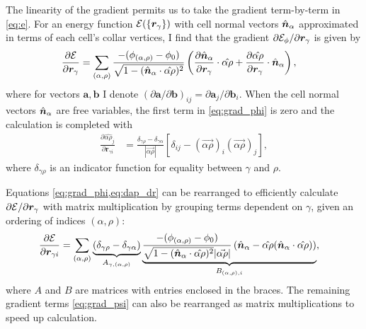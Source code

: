 The linearity of the gradient permits us to take the gradient term-by-term in \cref{eq:e}. For an energy function $\mathcal{E}(\{ \bm{r}_\gamma\})$ with cell normal vectors $\hat{\bm{n}}_\alpha$ approximated in terms of each cell's collar vertices, I find that the gradient $\partial \mathcal{E}_\phi / \partial \bm{r}_\gamma$ is given by 
\begin{align}
	\frac{\partial\mathcal{E}}{\partial\bm{r}_\gamma} &= \sum_{(\alpha,\rho)} \frac{-(\phi_{(\alpha,\rho)} - \phi_0)}{\sqrt{1-(\hat{\bm{n}}_\alpha \cdot \hat{\alpha\rho})^2}} \left(\frac{\partial \hat{\bm{n}}_\alpha}{\partial \bm{r}_\gamma} \cdot \hat{\alpha\rho} + \frac{\partial\hat{\alpha\rho}}{\partial\bm{r}_\gamma} \cdot \hat{\bm{n}}_\alpha \right), \label{eq:grad_phi}
\end{align}
\noindent where for vectors $\bm{a}, \bm{b}$ I denote $(\partial\bm{a}/\partial\bm{b})_{ij} = \partial\bm{a}_j /\partial\bm{b}_i$.
When the cell normal vectors $\hat{\bm{n}}_\alpha$ are free variables, the first term in \cref{eq:grad_phi} is zero and the calculation is completed with
\begin{align}
	\frac{\partial \hat{\alpha\rho}_j}{\partial\bm{r}_{\gamma i}} &= \frac{\delta_{\gamma\rho}-\delta_{\gamma\alpha}}{|\vec{\alpha\rho}|} \left[\delta_{ij} - (\vec{\alpha\rho})_i(\vec{\alpha\rho})_j \right], \label{eq:dap_dr}
\end{align}
where $\delta_{\gamma\rho}$ is an indicator function for equality between $\gamma$ and $\rho$. 

Equations \cref{eq:grad_phi,eq:dap_dr} can be rearranged to efficiently calculate $\partial\mathcal{E}/\partial\bm{r}_\gamma$ with matrix multiplication by grouping terms dependent on $\gamma$, given an ordering of indices $(\alpha,\rho)$:
\begin{align}
	\frac{\partial\mathcal{E}}{\partial\bm{r}_{\gamma i}} &= \sum_{(\alpha,\rho)} \underbrace{(\delta_{\gamma\rho} - \delta_{\gamma\alpha})}_{A_{\gamma,(\alpha,\rho)}} \underbrace{\frac{-(\phi_{(\alpha,\rho)} - \phi_0)}{\sqrt{1-(\hat{\bm{n}}_\alpha \cdot \hat{\alpha\rho})^2} |\vec{\alpha\rho}|} \left(\hat{\bm{n}}_\alpha - \hat{\alpha\rho} (\hat{\bm{n}}_\alpha \cdot \hat{\alpha\rho}) \right)}_{B_{(\alpha,\rho), i}}, \label{eq:grad_phi_mx}
\end{align}
where $A$ and $B$ are matrices with entries enclosed in the braces. 
The remaining gradient terms \cref{eq:grad_psi} can also be rearranged as matrix multiplications to speed up calculation.

